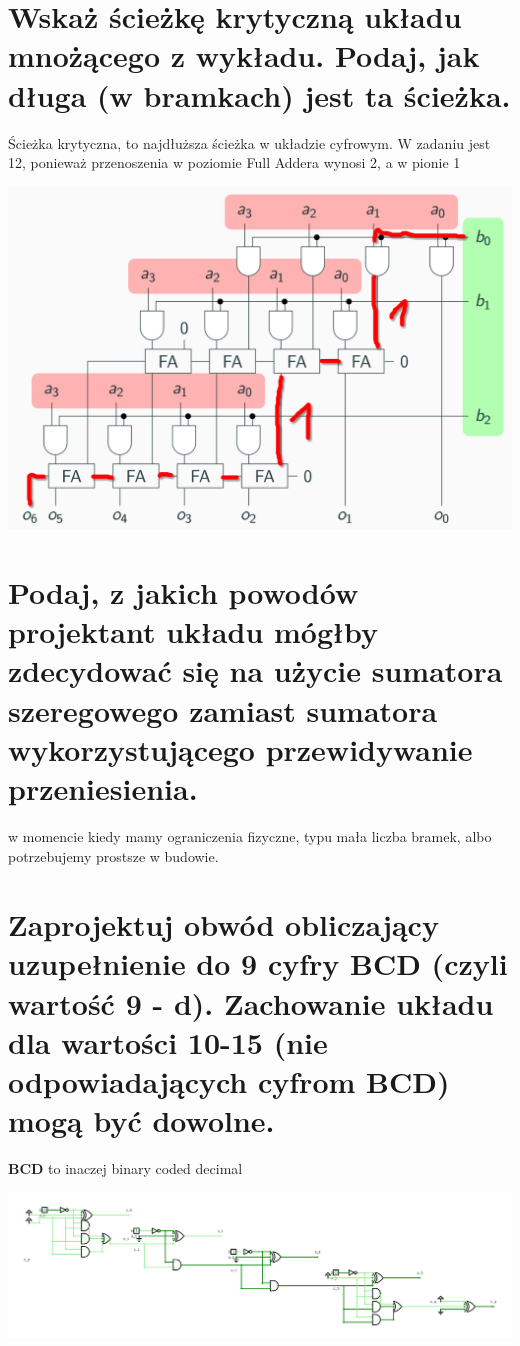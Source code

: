 \documentclass{article}
\begin{document}
\begin{enumerate}
\begin{enumerate}
	\section{Wskaż ścieżkę krytyczną układu mnożącego z wykładu. Podaj, jak długa (w bramkach) jest ta ścieżka.}
	Ścieżka krytyczna, to najdłuższa ścieżka w układzie cyfrowym.
	W zadaniu jest 12, ponieważ przenoszenia w poziomie Full Addera wynosi 2, a w pionie 1
	\begin{center}
	\includegraphics[scale=0.5]{./L03Z06.png}
	\end{center}
	\section{Podaj, z jakich powodów projektant układu mógłby zdecydować się na użycie sumatora szeregowego zamiast sumatora wykorzystującego przewidywanie przeniesienia.}
	w momencie kiedy mamy ograniczenia fizyczne, typu mała liczba bramek, albo potrzebujemy prostsze w budowie.
	\section{Zaprojektuj obwód obliczający uzupełnienie do 9 cyfry BCD (czyli wartość 9 - d). Zachowanie układu dla wartości 10-15 (nie odpowiadających cyfrom BCD) mogą być dowolne.}
	\textbf{BCD} to inaczej binary coded decimal
	\begin{center}
	\includegraphics[scale=0.075]{./L03Z08.png}
	\end{center}

\end{enumerate}
\end{enumerate}
\end{document}
